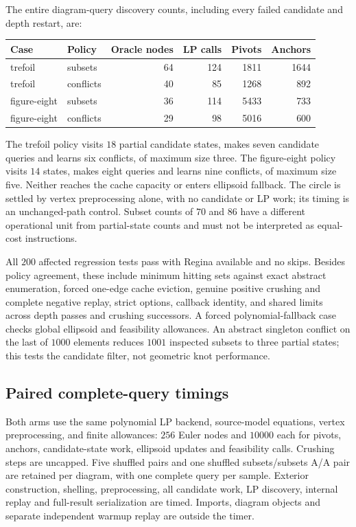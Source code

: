 The entire diagram-query discovery counts, including every failed
candidate and depth restart, are:
\begin{center}
\small
\begin{tabular}{llrrrr}
\toprule
Case & Policy & Oracle nodes & LP calls & Pivots & Anchors \\
\midrule
trefoil & subsets & 64 & 124 & 1811 & 1644 \\
trefoil & conflicts & 40 & 85 & 1268 & 892 \\
figure-eight & subsets & 36 & 114 & 5433 & 733 \\
figure-eight & conflicts & 29 & 98 & 5016 & 600 \\
\bottomrule
\end{tabular}
\end{center}
The trefoil policy visits $18$ partial candidate states, makes seven
candidate queries and learns six conflicts, of maximum size three.
The figure-eight policy visits $14$ states, makes eight queries and
learns nine conflicts, of maximum size five.  Neither reaches the cache
capacity or enters ellipsoid fallback.  The circle is settled by vertex
preprocessing alone, with no candidate or LP work; its timing is an
unchanged-path control.  Subset counts of $70$ and $86$ have a different
operational unit from partial-state counts and must not be interpreted
as equal-cost instructions.

All $200$ affected regression tests pass with Regina available and no
skips.  Besides policy agreement, these include minimum hitting sets
against exact abstract enumeration, forced one-edge cache eviction,
genuine positive crushing and complete negative replay, strict options,
callback identity, and shared limits across depth passes and crushing
successors.  A forced polynomial-fallback case checks global ellipsoid
and feasibility allowances.  An abstract singleton conflict on the last
of $1000$ elements reduces $1001$ inspected subsets to three partial
states; this tests the candidate filter, not geometric knot performance.

\subsection{Paired complete-query timings}

Both arms use the same polynomial LP backend, source-model equations,
vertex preprocessing, and finite allowances: $256$ Euler nodes and
$10000$ each for pivots, anchors, candidate-state work, ellipsoid updates
and feasibility calls.  Crushing steps are uncapped.  Five shuffled
pairs and one shuffled subsets/subsets A/A pair are retained per diagram,
with one complete query per sample.  Exterior construction, shelling,
preprocessing, all candidate work, LP discovery, internal replay and
full-result serialization are timed.  Imports, diagram objects and
separate independent warmup replay are outside the timer.

